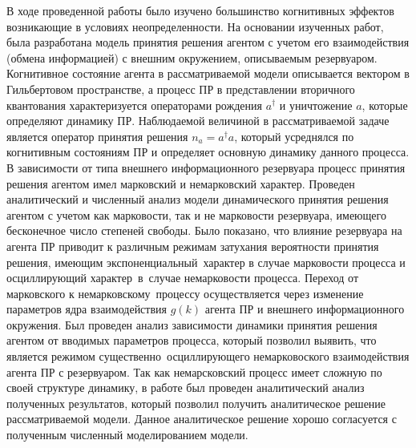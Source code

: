 \Conclusion %

В ходе проведенной работы было изучено большинство когнитивных эффектов возникающие в условиях неопределенности.
На основании изученных работ, была разработана модель принятия решения агентом с учетом его взаимодействия
(обмена информацией) с внешним окружением, описываемым резервуаром.
Когнитивное состояние агента в рассматриваемой модели описывается вектором в Гильбертовом пространстве,
а процесс ПР в представлении вторичного квантования характеризуется операторами рождения $a^{\dagger}$
и уничтожение $a$, которые определяют динамику ПР.
Наблюдаемой величиной в рассматриваемой задаче является оператор принятия решения $n_{a} = a^{\dagger} a$,
который усреднялся по когнитивным состояниям ПР и определяет основную динамику данного процесса.
В зависимости от типа внешнего информационного резервуара процесс принятия решения агентом имел марковский
и немарковский характер.
Проведен аналитический и численный анализ модели динамического принятия решения агентом с учетом как
марковости, так и не марковости резервуара, имеющего бесконечное число степеней свободы.
Было показано, что влияние резервуара на агента ПР приводит к различным режимам затухания вероятности
принятия решения, имеющим экспоненциальный~характер в случае марковости процесса и осциллирующий
характер~в~случае немарковости процесса.
Переход от марковского к немарковскому~процессу осуществляется через изменение параметров ядра
взаимодействия $g(k)$ агента ПР и внешнего информационного окружения.
Был проведен анализ зависимости динамики принятия решения агентом от вводимых параметров процесса,
который позволил выявить, что является режимом существенно~осциллирующего немарковоского взаимодействия
агента ПР с резервуаром.
Так как немарсковский процесс имеет сложную по своей структуре динамику, в работе был проведен аналитический
анализ полученных результатов, который позволил получить аналитическое решение рассматриваемой модели.
Данное аналитическое решение хорошо согласуется с полученным численный моделированием модели.

